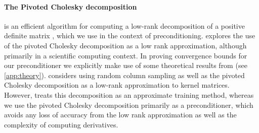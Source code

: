 \paragraph{The Pivoted Cholesky decomposition}
is an efficient algorithm for computing a low-rank decomposition of a positive definite matrix \cite{harbrecht2012low,bach2013sharp}, which we use in the context of preconditioning.
\citet{harbrecht2012low} explores the use of the pivoted Cholesky decomposition as a low rank approximation, although primarily in a scientific computing context.
In proving convergence bounds for our preconditioner we explicitly make use of some theoretical results from \cite{harbrecht2012low} (see \cref{app:theory}).
\citet{bach2013sharp} considers using random column sampling as well as the pivoted Cholesky decomposition as a low-rank approximation to kernel matrices.
However, \citet{bach2013sharp} treats this decomposition as an approximate training method, whereas we use the pivoted Cholesky decomposition primarily
as a preconditioner, which avoids any loss of accuracy from the low rank approximation as well as the complexity of computing derivatives.
